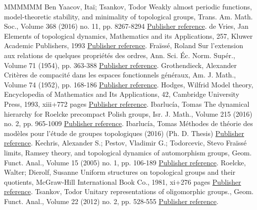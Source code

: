 \documentclass[11pt]{article}
\theoremstyle{definition}
\numberwithin{equation}{section}
\numberwithin{figure}{section}
\numberwithin{table}{section}
\begin{document}
\begin{thebibliography}{MMMMMM}
 Ben Yaacov, Itaï; Tsankov, Todor Weakly almost periodic functions, model-theoretic stability, and minimality of topological groups, Trans. Am. Math. Soc., Volume 368 (2016) no. 11, pp. 8267-8294 \href{https://ahl.centre-mersenne.org/item/AHL_2019__2__149_0/#BYT}{Publisher reference}.
 de Vries, Jan Elements of topological dynamics, Mathematics and its Applications, 257, Kluwer Academic Publishers, 1993 \href{https://ahl.centre-mersenne.org/item/AHL_2019__2__149_0/#dV}{Publisher reference}.
 Fraïssé, Roland Sur l’extension aux relations de quelques propriétés des ordres, Ann. Sci. Éc. Norm. Supér., Volume 71 (1954), pp. 363-388 \href{https://ahl.centre-mersenne.org/item/AHL_2019__2__149_0/#Fr0}{Publisher reference}.
 Grothendieck, Alexander Critères de compacité dans les espaces fonctionnels généraux, Am. J. Math., Volume 74 (1952), pp. 168-186 \href{https://ahl.centre-mersenne.org/item/AHL_2019__2__149_0/#Grothendieck}{Publisher reference}.
 Hodges, Wilfrid Model theory, Encyclopedia of Mathematics and Its Applications, 42, Cambridge University Press, 1993, xiii+772 pages \href{https://ahl.centre-mersenne.org/item/AHL_2019__2__149_0/#H}{Publisher reference}.
 Ibarlucía, Tomas The dynamical hierarchy for Roelcke precompact Polish groups, Isr. J. Math., Volume 215 (2016) no. 2, pp. 965-1009 \href{https://ahl.centre-mersenne.org/item/AHL_2019__2__149_0/#I1}{Publisher reference}.
 Ibarlucía, Tomas Méthodes de théorie des modèles pour l’étude de groupes topologiques (2016) (Ph. D. Thesis) \href{https://ahl.centre-mersenne.org/item/AHL_2019__2__149_0/#I0}{Publisher reference}.
 Kechris, Alexander S.; Pestov, Vladimir G.; Todorcevic, Stevo Fraïssé limits, Ramsey theory, and topological dynamics of automorphism groups, Geom. Funct. Anal., Volume 15 (2005) no. 1, pp. 106-189 \href{https://ahl.centre-mersenne.org/item/AHL_2019__2__149_0/#KPT}{Publisher reference}.
 Roelcke, Walter; Dierolf, Susanne Uniform structures on topological groups and their quotients, McGraw-Hill International Book Co., 1981, xi+276 pages \href{https://ahl.centre-mersenne.org/item/AHL_2019__2__149_0/#RD}{Publisher reference}.
 Tsankov, Todor Unitary representations of oligomorphic groups., Geom. Funct. Anal., Volume 22 (2012) no. 2, pp. 528-555 \href{https://ahl.centre-mersenne.org/item/AHL_2019__2__149_0/#Ts}{Publisher reference}.

\end{thebibliography}
\end{document}

